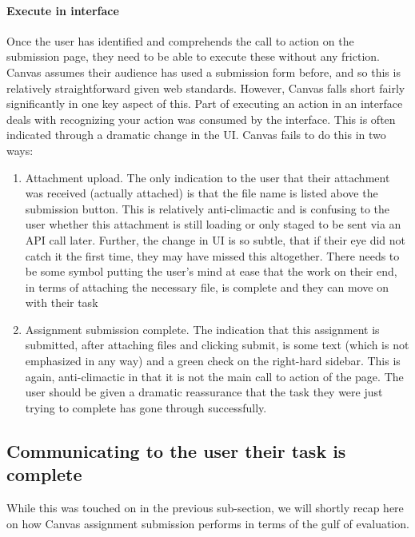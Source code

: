 \paragraph{Execute in interface}
Once the user has identified and comprehends the call to action on the submission page, they need to be able to execute these without any friction. Canvas assumes their audience has used a submission form before, and so this is relatively straightforward given web standards. However, Canvas falls short fairly significantly in one key aspect of this. Part of executing an action in an interface deals with recognizing your action was consumed by the interface. This is often indicated through a dramatic change in the UI. Canvas fails to do this in two ways:

\begin{enumerate}
\item
Attachment upload. The only indication to the user that their attachment was received (actually attached) is that the file name is listed above the submission button. This is relatively anti-climactic and is confusing to the user whether this attachment is still loading or only staged to be sent via an API call later. Further, the change in UI is so subtle, that if their eye did not catch it the first time, they may have missed this altogether. There needs to be some symbol putting the user's mind at ease that the work on their end, in terms of attaching the necessary file, is complete and they can move on with their task
\item
Assignment submission complete. The indication that this assignment is submitted, after attaching files and clicking submit, is some text (which is not emphasized in any way) and a green check on the right-hard sidebar. This is again, anti-climactic in that it is not the main call to action of the page. The user should be given a dramatic reassurance that the task they were just trying to complete has gone through successfully.
\end{enumerate}

\subsection{Communicating to the user their task is complete}

While this was touched on in the previous sub-section, we will shortly recap here on how Canvas assignment submission performs in terms of the gulf of evaluation.

